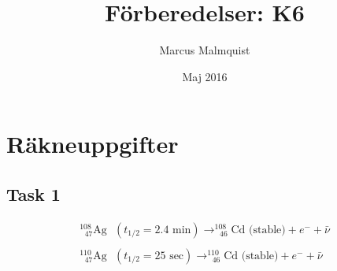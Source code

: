 \documentclass{article}
\title{Förberedelser: K6}
\author{Marcus Malmquist}
\date{Maj 2016}
\begin{document}
\maketitle
\section{Räkneuppgifter}
\subsection*{Task 1}
\begin{equation}
  \begin{array}{l}
    ^{108}_{\text{  }47}\text{Ag} \text{ }(t_{1/2}=2.4\text{ min})\rightarrow ^{108}_{\text{  }46}\text{Cd}\text{ (stable)}+e^{-}+\bar{\nu} \\
     \\
    ^{110}_{\text{  }47}\text{Ag} \text{ }(t_{1/2}=25\text{ sec})\rightarrow ^{110}_{\text{  }46}\text{Cd}\text{ (stable)}+e^{-}+\bar{\nu}
    \end{array}
\end{equation}
\end{document}

